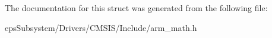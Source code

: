The documentation for this struct was generated from the following file\-:\begin{DoxyCompactItemize}
\item 
eps\-Subsystem/\-Drivers/\-C\-M\-S\-I\-S/\-Include/arm\-\_\-math.\-h\end{DoxyCompactItemize}
